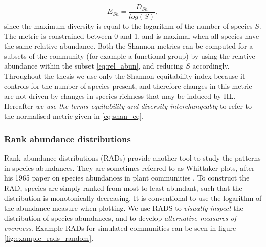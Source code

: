 \begin{equation}
E_{Sh} = \frac{D_{Sh}}{log(S)},
\label{eq:shan_eq}
\end{equation}
%
since the maximum diversity is equal to the logarithm of the number of species $S$. The metric is constrained between 0 and 1, and is maximal when all species have the same relative abundance. Both the Shannon metrics can be computed for a subsets of the community (for example a functional group) by using the relative abundance within the subset \eqref{eq:rel_abun}, and reducing $S$ accordingly. Throughout the thesis we use only the Shannon equitability index because it controls for the number of species present, and therefore changes in this metric are not driven by changes in species richness that may be induced by HL. Hereafter \emph{we use the terms equitability and diversity interchangeably} to refer to the normalised metric given in \eqref{eq:shan_eq}.  

\subsubsection{Rank abundance distributions}
\label{sec:define_rads}

Rank abundance distributions (RADs) provide another tool to study the patterns in species abundances. They are sometimes referred to as Whittaker plots, after his 1965 paper on species abundances in plant communities \cite{whittaker1965dominance}. To construct the RAD, species are simply ranked from most to least abundant, such that the distribution is monotonically decreasing. It is conventional to use the logarithm of the abundance measure when plotting. We use RADS to \emph{visually inspect} the distribution of species abundances, and to develop \emph{alternative measures of evenness}. Example RADs for simulated communities can be seen in figure \ref{fig:example_rads_random}.

